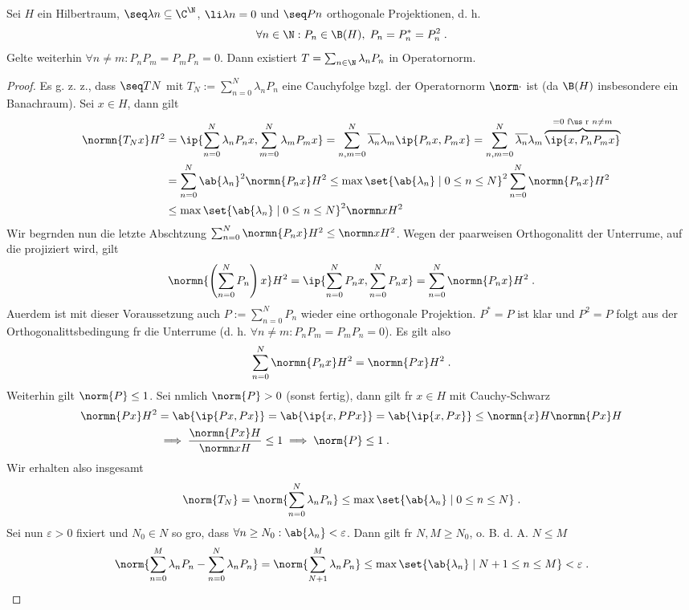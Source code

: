 \begin{theorem}
	Sei $H$ ein Hilbertraum, \(\seq \lambda n \subseteq \C^\N\), \(\li \lambda n = 0\) und \(\seq Pn\) orthogonale Projektionen, d. h. 
	\[\forall n\in\N: P_n \in \B(H), \;P_n = P^*_n = P_n^2\;.\]
	Gelte weiterhin \(\forall n\neq m: P_n P_m = P_m P_n = 0\).
	Dann existiert \(T = \sum_{n\in\N} \lambda_n P_n\) in Operatornorm.
	\label{spec_comp_pre_2}
\end{theorem}
\begin{proof}
	Es g. z. z., dass \(\seq TN\) mit \(T_N := \sum_{n=0}^N \lambda_n P_n\) eine Cauchyfolge bzgl. der Operatornorm \(\norm\cdot\) ist (da \(\B(H)\) insbesondere ein Banachraum). Sei \(x\in H\), dann gilt
	\begin{align*}
		\normn{T_Nx}H^2 &= \ip{\sum_{n=0}^N \lambda_n P_n x, \sum_{m=0}^N \lambda_m P_m x} = \sum_{n,m=0}^N \overline{\lambda_n}\lambda_m \ip{P_n x, P_m x} =  \sum_{n,m=0}^N \overline{\lambda_n}\lambda_m \overbrace{\ip{x, P_nP_mx}}^{=0\text{ f\us r } n\neq m} \\
		& = \sum_{n=0}^N \ab{\lambda_n}^2 \normn{P_nx}H^2 \leq \max\set{\ab{\lambda_n}\;\vert\; 0 \leq n \leq N}^2 \sum_{n=0}^N \normn{P_nx}H^2 \\
		& \leq  \max\set{\ab{\lambda_n} \;\vert\; 0 \leq n \leq N}^2  \normn xH^2
	\end{align*}
	Wir begr\us nden nun die letzte Absch\as tzung \(\sum_{n=0}^N \normn{P_nx}H^2 \leq \normn xH^2\). Wegen der paarweisen Orthogonalit\as t der Unterr\as ume, auf die projiziert wird, gilt
	\[\normn{\left(\sum_{n=0}^N P_n\right)x}H^2 =  \ip{\sum_{n=0}^N P_n x, \sum_{n=0}^N P_n x} = \sum_{n=0}^N \normn{P_nx}H^2\;.\]
	Au\s erdem ist mit dieser Voraussetzung auch \(P:= \sum_{n=0}^N P_n\) wieder eine orthogonale Projektion. \(P^* = P\) ist klar und \(P^2 = P\) folgt aus der Orthogonalit\as tsbedingung f\us r die Unterr\as ume (d. h. \(\forall n\neq m: P_n P_m = P_m P_n = 0\)). Es gilt also 
	\[\sum_{n=0}^N\normn{P_nx}H^2 = \normn{Px}H^2\;.\]
	Weiterhin gilt  \(\norm{P} \leq 1\). Sei n\as mlich \(\norm{P} > 0 \) (sonst fertig), dann gilt f\us r \(x\in H\) mit Cauchy-Schwarz
	\begin{align*}
	\normn{Px}H^2 &= \ab{\ip{Px, Px}} = \ab{\ip{x, PPx}} = \ab{\ip{x, Px}} \leq \normn{x}H \normn{Px}H \\&\implies \frac{\normn{Px}H}{\normn xH} \leq 1 \implies \norm{P} \leq 1\;.
	\end{align*}
	Wir erhalten also insgesamt
	\[\norm{T_N} = \norm{\sum_{n=0}^N \lambda_n P_n} \leq \max\set{\ab{\lambda_n}\;\vert\; 0 \leq n\leq N}\;.\]
	Sei nun \(\varepsilon > 0\) fixiert und \(N_0 \in N\) so gro\s{}, dass \(\forall n \geq N_0: \ab{\lambda_n}<\varepsilon\). Dann gilt f\us r \(N, M \geq N_0\), o. B. d. A. \(N \leq M\) 
	\[\norm{\sum_{n=0}^M \lambda_n P_n - \sum_{n=0}^N \lambda_n P_n} = \norm{\sum_{N+1}^M \lambda_n P_n} \leq  \max\set{\ab{\lambda_n}\;\vert\; N+1 \leq n \leq M} < \varepsilon\;.\]
	
\end{proof}

